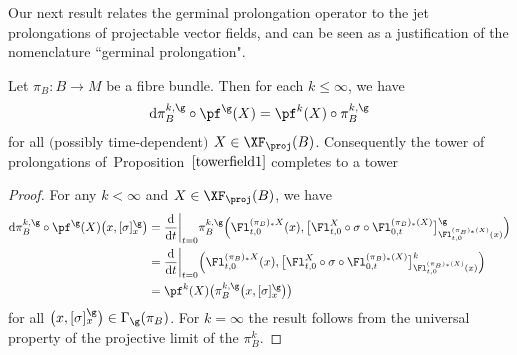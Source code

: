 Our next result relates the germinal prolongation operator to the jet prolongations of projectable vector fields, and can be seen as a justification of the nomenclature ``germinal prolongation".

\begin{Proposition}\label{germprol}
Let $\pi_{B}\colon B\rightarrow M$ be a fibre bundle. Then for each $k\leq\infty$, we have
\begin{gather*}
{\rm d}\pi_{B}^{k,\g}\circ \pf^{\g}(X) = \pf^{k}(X)\circ\pi_{B}^{k,\g}
\end{gather*}
for all $($possibly time-dependent$)$ $X\in\XF_{\proj}(B)$. Consequently the tower of prolongations of~Pro\-po\-si\-tion~$\ref{towerfield1}$ completes to a tower
\begin{center}
\end{center}
\end{Proposition}

\begin{proof}
For any $k<\infty$ and $X\in\XF_{\proj}(B)$, we have
\begin{align*}
{\rm d}\pi_{B}^{k,\g}\circ\pf^{\g}(X)\big(x,[\sigma]^{\g}_{x}\big)
&= \frac{\rm d}{{\rm d}t}\bigg|_{t=0}\pi_{B}^{k,\g}\Big(\Fl^{(\pi_{B})_{*}X}_{t,0}(x),
\big[\Fl^{X}_{t,0}\circ\sigma\circ\Fl^{(\pi_{B})_{*}(X)}_{0,t}\big]^{\g}_{\Fl_{t,0}^{(\pi_{B})_{*}(X)}(x)}\Big)
\\
&= \frac{\rm d}{{\rm d}t}\bigg|_{t=0}\Big(\Fl^{(\pi_{B})_{*}X}_{t,0}(x), \big[\Fl^{X}_{t,0}\circ\sigma\circ\Fl^{(\pi_{B})_{*}(X)}_{0,t}\big]^{k}_{\Fl^{(\pi_{B})_{*}(X)}_{t,0}(x)}\Big)
\\
&= \pf^{k}(X)\big(\pi_{B}^{k,\g}\big(x,[\sigma]^{\g}_{x}\big)\big)
\end{align*}
for all $\big(x,[\sigma]^{\g}_{x}\big)\in\Gamma_{\g}(\pi_{B})$. For $k=\infty$ the result follows from the universal property of the projective limit of the $\pi_{B}^{k}$.
\end{proof}

